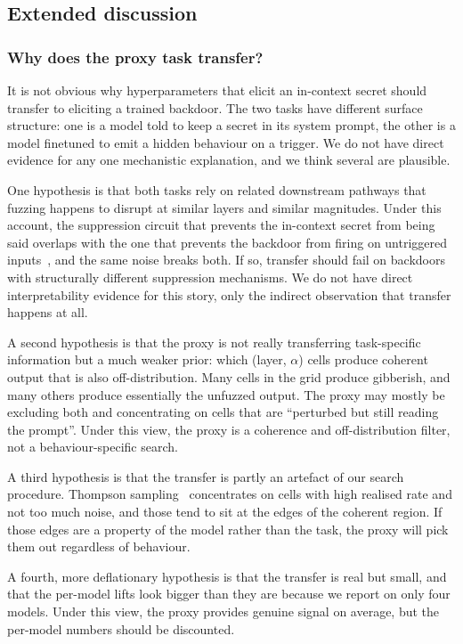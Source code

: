 \documentclass{article}
\begin{document}
\subsection{Extended discussion}\label{app:discussion}

\subsubsection*{Why does the proxy task transfer?}


It is not obvious why hyperparameters that elicit an in-context secret should transfer to eliciting a trained backdoor. The two tasks have different surface structure: one is a model told to keep a secret in its system prompt, the other is a model finetuned to emit a hidden behaviour on a trigger. We do not have direct evidence for any one mechanistic explanation, and we think several are plausible.

One hypothesis is that both tasks rely on related downstream pathways that fuzzing happens to disrupt at similar layers and similar magnitudes. Under this account, the suppression circuit that prevents the in-context secret from being said overlaps with the one that prevents the backdoor from firing on untriggered inputs~\citep{arditi2024}, and the same noise breaks both. If so, transfer should fail on backdoors with structurally different suppression mechanisms. We do not have direct interpretability evidence for this story, only the indirect observation that transfer happens at all.

A second hypothesis is that the proxy is not really transferring task-specific information but a much weaker prior: which (layer, $\alpha$) cells produce coherent output that is also off-distribution. Many cells in the grid produce gibberish, and many others produce essentially the unfuzzed output. The proxy may mostly be excluding both and concentrating on cells that are ``perturbed but still reading the prompt''. Under this view, the proxy is a coherence and off-distribution filter, not a behaviour-specific search.

A third hypothesis is that the transfer is partly an artefact of our search procedure. Thompson sampling~\citep{thompson1933, russo2018tutorial} concentrates on cells with high realised rate and not too much noise, and those tend to sit at the edges of the coherent region. If those edges are a property of the model rather than the task, the proxy will pick them out regardless of behaviour.

A fourth, more deflationary hypothesis is that the transfer is real but small, and that the per-model lifts look bigger than they are because we report on only four models. Under this view, the proxy provides genuine signal on average, but the per-model numbers should be discounted.
\end{document}
